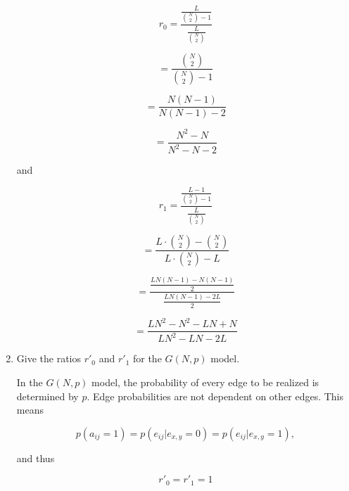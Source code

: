 \begin{enumerate}
	\begin{equation}
	r_0 =\frac{
					 \frac{L}{\binom{N}{2} - 1}
					 }
					 {
					 \frac{L}{\binom{N}{2}}
					 }
	\end{equation}
	
	\begin{equation}
	= \frac{\binom{N}{2}}{\binom{N}{2} - 1}
	\end{equation}
	
	\begin{equation}
	= \frac{N(N - 1)}{N(N - 1) - 2}
	\end{equation}
	
	\begin{equation}
	= \frac{N^2 - N}{N^2 - N - 2}
	\end{equation}
	
	and 
	
	\begin{equation}
	r_1 = \frac{
					 \frac{L - 1}{\binom{N}{2} - 1}
					 }
					 {
					 \frac{L}{\binom{N}{2}}
					 }
	\end{equation}
	
	\begin{equation}
	= \frac{
			L \cdot \binom{N}{2} - \binom{N}{2}
		}
		{
			L \cdot \binom{N}{2} - L		
		}
	\end{equation}
	
	\begin{equation}
	= \frac{
			\frac{
				LN(N - 1) - N(N - 1)
			}
			{
				2
			}		
		}
		{
			\frac{
				LN(N - 1) - 2L
			}
			{
				2
			}	
		}
	\end{equation}
	
	\begin{equation}
	= \frac{
			LN^2 - N^2 - LN + N
		}{
			LN^2 - LN - 2L
		}
	\end{equation}
	
	\item Give the ratios $r'_0$ and $r'_1$ for the $G(N,p)$ model.
	
	In the $G(N,p)$ model, the probability of every edge to be realized is determined by $p$. Edge probabilities are not dependent on other edges. This means
	
	\begin{equation}
		p(a_{ij} = 1) = p(e_{ij}|e_{x,y}=0) = p(e_{ij}|e_{x,y}=1),
	\end{equation}
	
	and thus
	
	\begin{equation}
		r'_0 = r'_1 = 1
	\end{equation}
	

\end{enumerate}
